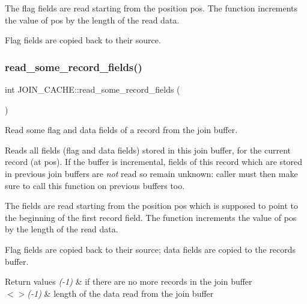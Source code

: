 The flag fields are read starting from the position \textquotesingle{}pos\textquotesingle{}. The function increments the value of \textquotesingle{}pos\textquotesingle{} by the length of the read data.

Flag fields are copied back to their source. \mbox{\label{group__Query__Optimizer_ga20c8bd509fba4099611e8a7b01c115d8}} 
\subsubsection{\texorpdfstring{read\+\_\+some\+\_\+record\+\_\+fields()}{read\_some\_record\_fields()}}
{\footnotesize\ttfamily int J\+O\+I\+N\+\_\+\+C\+A\+C\+H\+E\+::read\+\_\+some\+\_\+record\+\_\+fields (\begin{DoxyParamCaption}{ }\end{DoxyParamCaption})\hspace{0.3cm}{\ttfamily [protected]}}

Read some flag and data fields of a record from the join buffer.

Reads all fields (flag and data fields) stored in this join buffer, for the current record (at \textquotesingle{}pos\textquotesingle{}). If the buffer is incremental, fields of this record which are stored in previous join buffers are {\itshape not} read so remain unknown\+: caller must then make sure to call this function on previous buffers too.

The fields are read starting from the position \textquotesingle{}pos\textquotesingle{} which is supposed to point to the beginning of the first record field. The function increments the value of \textquotesingle{}pos\textquotesingle{} by the length of the read data.

Flag fields are copied back to their source; data fields are copied to the record\textquotesingle{}s buffer.


\begin{DoxyRetVals}{Return values}
{\em (-\/1)} & if there are no more records in the join buffer \\
\hline
{\em $<$$>$(-\/1)} & length of the data read from the join buffer \\
\hline
\end{DoxyRetVals}
\mbox{\label{group__Query__Optimizer_gaef4f64b9b280796d9abe945b2eda94ac}} 
